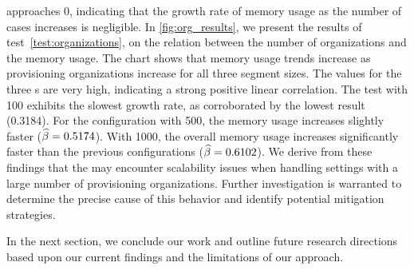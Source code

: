 approaches \num{0}, indicating that the growth rate of memory usage as the number of cases increases is negligible.
%
In \cref{fig:org_results}, we present the results of test~\ref{test:organizations}, on the relation between the number of organizations and the memory usage. The chart shows that memory usage trends increase as provisioning organizations increase for all three segment sizes. The {\Rlin} values for the three {\SegSize}s are very high, %
indicating a strong positive linear correlation. %
The test with {\SegSize} \num{100} exhibits the slowest growth rate, as corroborated by the lowest {\Slope} result (\num{0.3184}). 
For the configuration with {\SegSize} \num{500}, the memory usage increases slightly faster (${\widehat{\mathcal{\beta}}} = {0.5174}$). With {\SegSize} \num{1000}, the overall memory usage increases significantly faster than the previous configurations (${\widehat{\mathcal{\beta}}} = 0.6102$). We derive from these findings that the  may encounter scalability issues when handling settings with a large number of provisioning organizations. Further investigation is warranted to determine the precise cause of this behavior and identify potential mitigation strategies. 

In the next section, we conclude our work and outline future research directions based upon our current findings and the limitations of our approach.
